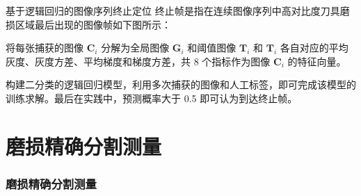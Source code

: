 \documentclass[aspectratio=169,t,xcolor=table,10pt]{ctexbeamer}
\numberwithin{equation}{section} %
\begin{document}
	\begin{frame}
		\begin{block}{基于逻辑回归的图像序列终止定位}
			\qquad 终止帧是指在连续图像序列中高对比度刀具磨损区域最后出现的图像帧如下图所示：
			\begin{figure}[H]
				\centering
				\hspace*{48pt}
			\end{figure}
			将每张捕获的图像 $\boldsymbol{C}_i$ 分解为全局图像 $\boldsymbol{G}_i$ 和阈值图像 $\boldsymbol{T}_i$ 和 $\boldsymbol{T}_i$ 各自对应的平均灰度、灰度方差、平均梯度和梯度方差，共 8 个指标作为图像 $\boldsymbol{C}_i$ 的特征向量。
			
			\qquad 构建二分类的逻辑回归模型，利用多次捕获的图像和人工标签，即可完成该模型的训练求解。最后在实践中，预测概率大于 0.5 即可认为到达终止帧。
		\end{block}
	\end{frame}


	\section{磨损精确分割测量}
	\begin{frame}
		\frametitle{磨损精确分割测量}
	\end{frame}
	
\end{document}
